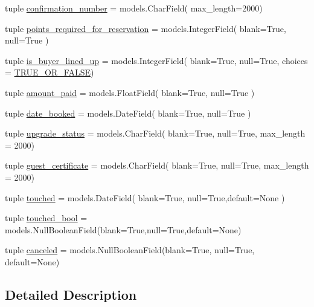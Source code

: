 \begin{DoxyCompactItemize}
\item 
tuple \hyperlink{classreservation__manager_1_1models_1_1Reservation_aa8d05ddeae1fbe64623db8ca91ea5d21}{confirmation\-\_\-number} = models.\-Char\-Field( max\-\_\-length=2000)
\item 
tuple \hyperlink{classreservation__manager_1_1models_1_1Reservation_a30f975d5fa7a98aed94b7950522f912e}{points\-\_\-required\-\_\-for\-\_\-reservation} = models.\-Integer\-Field( blank=True, null=True )
\item 
tuple \hyperlink{classreservation__manager_1_1models_1_1Reservation_ad11d83584bd6a7c6b13c9a9ec14945e6}{is\-\_\-buyer\-\_\-lined\-\_\-up} = models.\-Integer\-Field( blank=True, null=True, choices = \hyperlink{namespacereservation__manager_1_1models_af585bf5affae3c2f4d6f7ee54371a0ec}{T\-R\-U\-E\-\_\-\-O\-R\-\_\-\-F\-A\-L\-S\-E})
\item 
tuple \hyperlink{classreservation__manager_1_1models_1_1Reservation_ac2f88fc49e8a194dc3eb780073fef8f5}{amount\-\_\-paid} = models.\-Float\-Field( blank=True, null=True )
\item 
tuple \hyperlink{classreservation__manager_1_1models_1_1Reservation_aa936091d190e04a52c4b9da7ee2ded77}{date\-\_\-booked} = models.\-Date\-Field( blank=True, null=True )
\item 
tuple \hyperlink{classreservation__manager_1_1models_1_1Reservation_a7c49fa9a9dffa54479e28154f87c0a7d}{upgrade\-\_\-status} = models.\-Char\-Field( blank=True, null=True, max\-\_\-length = 2000)
\item 
tuple \hyperlink{classreservation__manager_1_1models_1_1Reservation_ac844ab7132b06fb3c171707f201bf608}{guest\-\_\-certificate} = models.\-Char\-Field( blank=True, null=True, max\-\_\-length = 2000)
\item 
tuple \hyperlink{classreservation__manager_1_1models_1_1Reservation_a8ee73ba43a314afaf611e4fe84533242}{touched} = models.\-Date\-Field( blank=True, null=True,default=None )
\item 
tuple \hyperlink{classreservation__manager_1_1models_1_1Reservation_ad77ac02ca8b0e2f125a00ccb04e03589}{touched\-\_\-bool} = models.\-Null\-Boolean\-Field(blank=True,null=True,default=None)
\item 
tuple \hyperlink{classreservation__manager_1_1models_1_1Reservation_a4aeae1676d89b1d431438c20939ce812}{canceled} = models.\-Null\-Boolean\-Field(blank=True, null=True, default=None)
\end{DoxyCompactItemize}


\subsection{Detailed Description}



